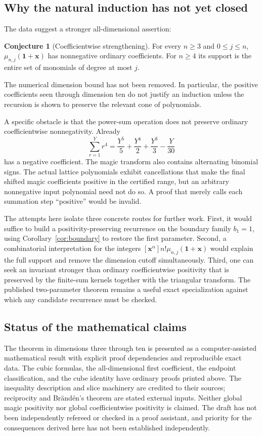 \documentclass[11pt]{article}
\theoremstyle{definition}
\newtheorem{conjecture}[theorem]{Conjecture}
\newcommand{\xx}{\mathbf x}
\newcommand{\one}{\mathbf 1}
\numberwithin{equation}{section}
\begin{document}
\subsection{Why the natural induction has not yet closed}
The data suggest a stronger all-dimensional assertion:
\begin{conjecture}[Coefficientwise strengthening]
\label{conj:strong}
For every $n\ge3$ and $0\le j\le n$,
$\mu_{n,j}(\one+\xx)$ has nonnegative ordinary coefficients.
For $n\ge4$ its support is the entire set of monomials of degree at most $j$.
\end{conjecture}
The numerical dimension bound has not been removed. In particular, the
positive coefficients seen through dimension ten do not justify an
induction unless the recursion is shown to preserve the relevant cone
of polynomials.

A specific obstacle is that the power-sum operation does not preserve
ordinary coefficientwise nonnegativity. Already
\[
 \sum_{r=1}^Y r^4
 =\frac{Y^5}{5}+\frac{Y^4}{2}+\frac{Y^3}{3}-\frac{Y}{30}
\]
has a negative coefficient. The magic transform also contains alternating
binomial signs. The actual lattice polynomials exhibit cancellations
that make the final shifted magic coefficients positive in the certified
range, but an arbitrary nonnegative input polynomial need not do so.
A proof that merely calls each summation step ``positive'' would be invalid.

The attempts here isolate three concrete routes for further work.
First, it would suffice to build a positivity-preserving recurrence on the
boundary family $b_1=1$, using Corollary~\ref{cor:boundary} to restore the
first parameter. Second, a combinatorial interpretation for the integers
$[\xx^\alpha]n!\mu_{n,j}(\one+\xx)$ would explain the full support and
remove the dimension cutoff simultaneously. Third, one can seek an
invariant stronger than ordinary coefficientwise positivity that is
preserved by the finite-sum kernels together with the triangular transform.
The published two-parameter theorem remains a useful exact specialization
against which any candidate recurrence must be checked.

\subsection{Status of the mathematical claims}
The theorem in dimensions three through ten is presented as a
computer-assisted mathematical result with explicit proof dependencies and
reproducible exact data. The cubic formulas, the all-dimensional first
coefficient, the endpoint classification, and the cube identity have
ordinary proofs printed above. The inequality description and slice
machinery are credited to their sources; reciprocity and Br\"and\'en's
theorem are stated external inputs. Neither global magic positivity nor
global coefficientwise positivity is claimed. The draft has not been
independently refereed or checked in a proof assistant, and priority for
the consequences derived here has not been established independently.
\end{document}
